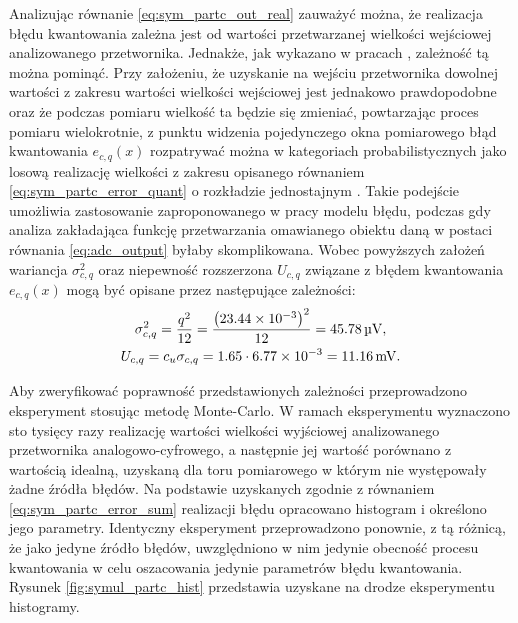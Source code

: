 Analizując równanie \eqref{eq:sym_partc_out_real} zauważyć można, że realizacja błędu kwantowania zależna jest od wartości przetwarzanej wielkości wejściowej analizowanego przetwornika. Jednakże, jak wykazano w pracach \cite{sienkowski_kwant, sienkowski_adc}, zależność tą można pominąć. Przy założeniu, że uzyskanie na wejściu przetwornika dowolnej wartości z zakresu wartości wielkości wejściowej jest jednakowo prawdopodobne oraz że podczas pomiaru wielkość ta będzie się zmieniać, powtarzając proces pomiaru wielokrotnie, z punktu widzenia pojedynczego okna pomiarowego błąd kwantowania $e_{c,q}(x)$ rozpatrywać można w kategoriach probabilistycznych jako losową realizację wielkości z zakresu opisanego równaniem \eqref{eq:sym_partc_error_quant} o rozkładzie jednostajnym \cite{jakubiec_system}. Takie podejście umożliwia zastosowanie zaproponowanego w pracy modelu błędu, podczas gdy analiza zakładająca funkcję przetwarzania omawianego obiektu daną w postaci równania \eqref{eq:adc_output} byłaby skomplikowana. Wobec powyższych założeń wariancja $\sigma_{c,q}^{2}$ oraz niepewność rozszerzona $U_{c,q}$ związane z błędem kwantowania $e_{c,q}(x)$ mogą być opisane przez następujące zależności:
\begin{gather}
\sigma_{c,q}^{2} = \frac{ q^{2}}{12} = \frac{\left(\num{23.44e-3}\right)^{2} }{12} = \qty{45.78}{\micro V} \label{eq:sym_partc_var_quant}, \\
U_{c,q} = c_{u} \sigma_{c,q} = 1.65 \cdot \num{6.77e-3} = \qty{11.16}{mV} \label{eq:sym_partc_uncert_quant}.
\end{gather}

Aby zweryfikować poprawność przedstawionych zależności przeprowadzono eksperyment stosując metodę Monte-Carlo. W ramach eksperymentu wyznaczono sto tysięcy razy realizację wartości wielkości wyjściowej analizowanego przetwornika analogowo-cyfrowego, a następnie jej wartość porównano z wartością idealną, uzyskaną dla toru pomiarowego w którym nie występowały żadne źródła błędów. Na podstawie uzyskanych zgodnie z równaniem \eqref{eq:sym_partc_error_sum} realizacji błędu opracowano histogram i określono jego parametry. Identyczny eksperyment przeprowadzono ponownie, z tą różnicą, że jako jedyne źródło błędów, uwzględniono w nim jedynie obecność procesu kwantowania w celu oszacowania jedynie parametrów błędu kwantowania. Rysunek \ref{fig:symul_partc_hist} przedstawia uzyskane na drodze eksperymentu histogramy.

